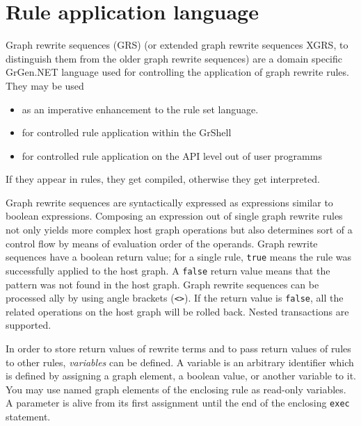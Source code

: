 \chapter{Rule application language}
\label{cha:xgrs}

Graph rewrite sequences (GRS) (or extended graph rewrite sequences XGRS, to distinguish them from the older graph rewrite sequences) are a domain specific GrGen.NET language used for controlling the application of graph rewrite rules. They may be used
\begin{itemize}
\item as an imperative enhancement to the rule set language.
\item for controlled rule application within the GrShell
\item for controlled rule application on the API level out of user programms
\end{itemize}

If they appear in rules, they get compiled, otherwise they get interpreted.

Graph rewrite sequences are syntactically expressed as expressions similar to boolean expressions.
Composing an expression out of single graph rewrite rules not only yields more complex host graph operations but also determines sort of a control flow by means of evaluation order of the operands.
Graph rewrite sequences have a boolean return value; for a single rule, \texttt{true} means the rule was successfully applied to the host graph.
A \texttt{false} return value means that the pattern was not found in the host graph.
Graph rewrite sequences can be processed ally by using angle brackets (\texttt{<>}).
If the return value is \texttt{false}, all the related operations on the host graph will be rolled back.
Nested transactions are supported.

In order to store return values of rewrite terms and to pass return values of rules to other rules, \emph{variables} can be defined.
A variable is an arbitrary identifier which is defined by assigning a graph element, a boolean value, or another variable to it.
You may use named graph elements of the enclosing rule as read-only variables.
A parameter is alive from its first assignment until the end of the enclosing \texttt{exec} statement.

